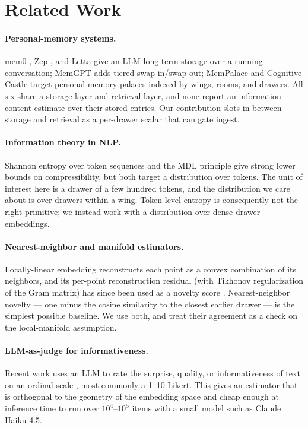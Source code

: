 \documentclass[11pt]{article}
\begin{document}
\section{Related Work}
\label{sec:related}

\paragraph{Personal-memory systems.}
mem0 \citep{mem0site}, Zep \citep{zepsite}, and Letta \citep{lettasite}
give an LLM long-term storage over a running conversation; MemGPT
\citep{memgpt} adds tiered swap-in/swap-out; MemPalace
\citep{mempalace} and Cognitive Castle \citep{cognitivecastle} target
personal-memory palaces indexed by wings, rooms, and drawers. All six
share a storage layer and retrieval layer, and none report an
information-content estimate over their stored entries. Our
contribution slots in between storage and retrieval as a
per-drawer scalar that can gate ingest.

\paragraph{Information theory in NLP.}
Shannon entropy over token sequences \citep{shannon1948} and the MDL
principle \citep{rissanen1978,cover2006} give strong lower bounds on
compressibility, but both target a distribution over tokens. The unit of
interest here is a drawer of a few hundred tokens, and the distribution
we care about is over drawers within a wing. Token-level entropy is
consequently not the right primitive; we instead work with a
distribution over dense drawer embeddings.

\paragraph{Nearest-neighbor and manifold estimators.}
Locally-linear embedding \citep{roweis2000lle} reconstructs each point
as a convex combination of its neighbors, and its per-point
reconstruction residual (with Tikhonov regularization of the Gram
matrix) has since been used as a novelty score
\citep{tenenbaum2000isomap}. Nearest-neighbor novelty --- one minus the
cosine similarity to the closest earlier drawer --- is the simplest
possible baseline. We use both, and treat their agreement as a check on
the local-manifold assumption.

\paragraph{LLM-as-judge for informativeness.}
Recent work uses an LLM to rate the surprise, quality, or informativeness
of text on an ordinal scale \citep{zheng2023judge}, most commonly a 1--10
Likert. This gives an estimator that is orthogonal to the geometry of
the embedding space and cheap enough at inference time to run over
$10^4$--$10^5$ items with a small model such as Claude Haiku 4.5.
\end{document}

